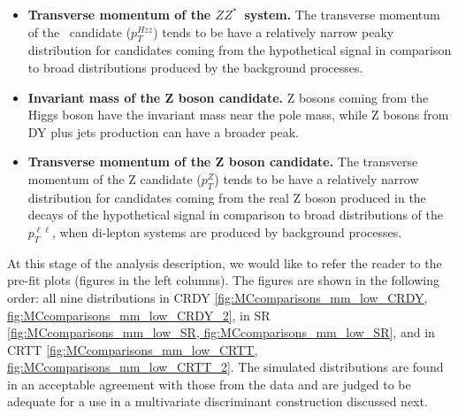 \begin{itemize}
\item{\bfseries Transverse momentum of the $ZZ^*$~system.} 
The transverse momentum of the \HZZ~candidate ($p_T^{Hzz}$) tends to be have a relatively narrow peaky distribution for candidates coming from the hypothetical signal in comparison to broad distributions produced by the background processes. 

\item{\bfseries Invariant mass of the Z boson candidate.} 
Z bosons coming from the Higgs boson have the invariant mass near the pole mass, while Z bosons from DY plus jets production can have a broader peak.

\item{\bfseries Transverse momentum of the Z boson candidate.} 
The transverse momentum of the Z candidate ($p_T^Z$) tends to be have a relatively narrow distribution for candidates coming from the real Z boson produced in the decays of the hypothetical signal in comparison to broad distributions of the $p_T^{\ell\ell}$, when di-lepton systems are produced by background processes. 

\end{itemize}
           
At this stage of the analysis description, we would like to refer the reader to the pre-fit plots (figures in the left columns). The figures are shown in the following order: all nine distributions in CRDY \ref{fig:MCcomparisons_mm_low_CRDY, fig:MCcomparisons_mm_low_CRDY_2}, in SR \ref{fig:MCcomparisons_mm_low_SR, fig:MCcomparisons_mm_low_SR}, and in CRTT \ref{fig:MCcomparisons_mm_low_CRTT, fig:MCcomparisons_mm_low_CRTT_2}. The simulated distributions are found in an acceptable agreement with those from the data and are 
           judged to be adequate for a use in a multivariate discriminant construction discussed next. 







